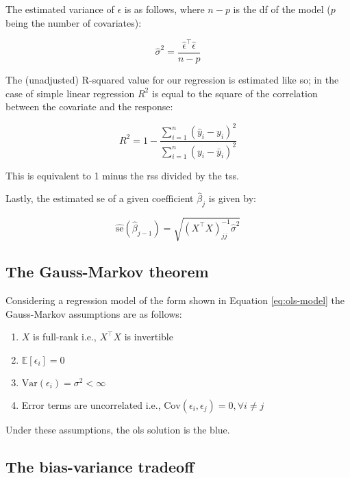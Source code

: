 \documentclass{report}
\begin{document}
The estimated variance of $\epsilon$ is as follows, where $n - p$ is the \gls{df} of the model ($p$ being the number of covariates):

\begin{equation}\label{eq:ols-sigma-squared}
    \hat{\sigma}^2 = \frac{\hat{\epsilon}^\intercal\hat{\epsilon}}{n - p}
\end{equation}

The (unadjusted) R-squared value for our regression is estimated like so; in the case of simple linear regression $R^2$ is equal to the square of the correlation between the covariate and the response:

\begin{equation}\label{ols-r-squared}
    R^2 = 1 - \frac{\sum_{i=1}^n (\hat{y}_i - y_i)^2}{\sum_{i=1}^n (y_i - \bar{y}_i)^2}
\end{equation}

This is equivalent to 1 minus the \gls{rss} divided by the \gls{tss}. 

Lastly, the estimated \gls{se} of a given coefficient $\hat{\beta}_j$ is given by:

\begin{equation}\label{ols-beta-se}
    \widehat{\text{se}}\left(\hat{\beta}_{j-1}\right) = \sqrt{(X^\intercal X)^{-1}_{jj}\hat{\sigma}^2}
\end{equation}

\subsection{The Gauss-Markov theorem}

Considering a regression model of the form shown in Equation \ref{eq:ols-model} the Gauss-Markov assumptions are as follows:

\begin{enumerate}
    \item $X$ is full-rank i.e., $X^\intercal X$ is invertible
    \item $\mathbb{E}[\epsilon_i] = 0$
    \item $\text{Var}(\epsilon_i) = \sigma^2 < \infty$
    \item Error terms are uncorrelated i.e., $\text{Cov}(\epsilon_i, \epsilon_j) = 0, \forall i \neq j$
\end{enumerate}

Under these assumptions, the \gls{ols} solution is the \gls{blue}.

\subsection{The bias-variance tradeoff}\label{sec:bias-variance-tradeoff}
\end{document}
